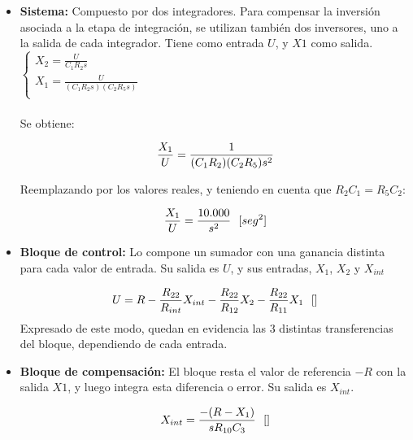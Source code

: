 \documentclass[letterpaper, 10 pt, conference]{ieeeconf}  %
\begin{document}
\begin{itemize}
     \item \textbf{Sistema:} Compuesto por dos integradores. Para compensar la inversión asociada a la etapa de integración, se utilizan también dos inversores, uno a la salida de cada integrador. Tiene como entrada $U$, y $X1$ como salida.\\

     
    
          $\begin{cases}
            X_2 = \frac{U}{C_1R_2s}             \\
            X_1 = \frac{U}{(C_1R_2s)(C_2R_5s)}  \\
            \end{cases}$ \\ \\
        
        
     Se obtiene:
     
     \begin{equation}
        \frac{X_1}{U} = \frac{1}{(C_1R_2)(C_2R_5)s^2}  \\
        \end{equation}

    Reemplazando por los valores reales, y teniendo en cuenta que $R_{2}C_{1} = R_{5}C_{2}$:
    
    \begin{equation}
        \frac{X_1}{U} = \frac{10.000}{s^2}  \  \  [seg^2] \\
        \end{equation}
    
     \item \textbf{Bloque de control:} Lo compone un sumador con una ganancia distinta para cada valor de entrada. Su salida es $U$, y sus entradas, $X_1$, $X_2$ y $X_{int}$

     \begin{equation}
        U = R - \frac{R_{22}}{R_{int}}X_{int} - \frac{R_{22}}{R_{12}}X_{2} - \frac{R_{22}}{R_{11}}X_{1}   \  \  [] \\
        \end{equation}
    Expresado de este modo, quedan en evidencia las 3 distintas transferencias del bloque, dependiendo de cada entrada. \\
    
     \item \textbf{Bloque de compensación:} El bloque resta el valor de referencia $-R$ con la salida $X1$, y luego integra esta diferencia o error. Su salida es $X_{int}$.
     
     \begin{equation}
        X_{int} = \frac{-(R-X_{1})}{{sR_{10}}C_{3}}    \  \  [] \\
        \end{equation}

\end{itemize}
\end{document}
